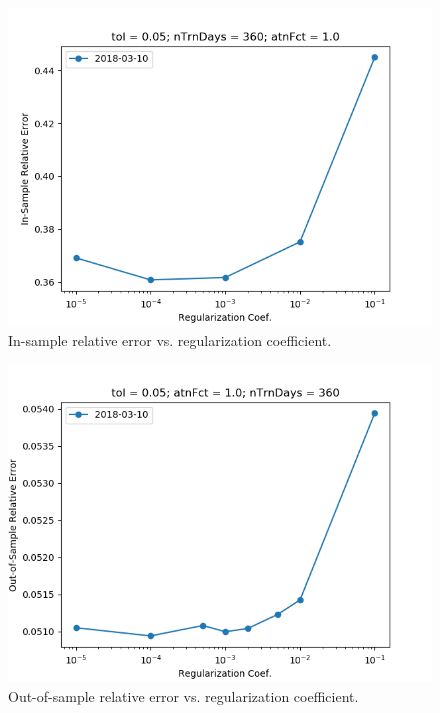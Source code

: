 \documentclass{article}
\begin{document}
\begin{figure}\label{fig:regCoef-sensitivity-error}
\includegraphics[bb=0 0 640 480]{figures/regCoef-sensitivity-error.png}
\caption{In-sample relative error vs. regularization coefficient.}
\end{figure}

\begin{figure}\label{fig:regCoef-sensitivity-oos-error}
\includegraphics[bb=0 0 640 480]{figures/regCoef-sensitivity-oos-error.png}
\caption{Out-of-sample relative error vs. regularization coefficient.}
\end{figure}
\end{document}
